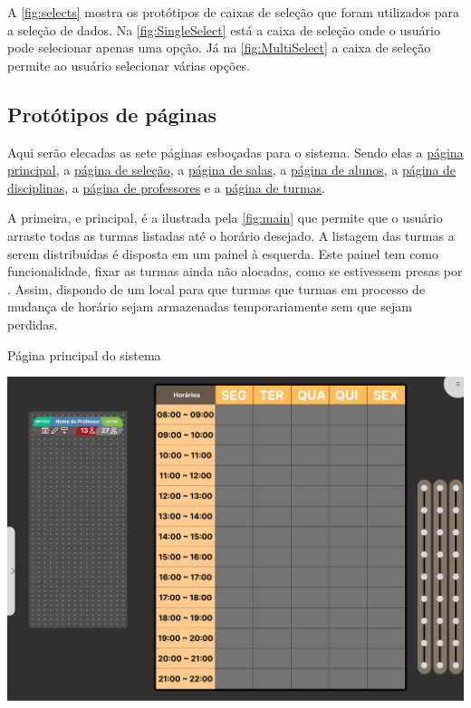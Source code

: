 A \autoref{fig:selects} mostra os protótipos de caixas de seleção que foram utilizados para a seleção de dados. Na \autoref{fig:SingleSelect} está a caixa de seleção onde o usuário pode selecionar apenas uma opção. Já na \autoref{fig:MultiSelect} a caixa de seleção permite ao usuário selecionar várias opções.

\subsection{Protótipos de páginas} \label{subsec:páginas} %

Aqui serão elecadas as sete páginas esboçadas para o sistema. Sendo elas a \hyperref[fig:main]{página principal}, a \hyperref[fig:CRUD_main]{página de seleção}, a \hyperref[fig:CRUD_salas_vazias]{página de salas}, a \hyperref[fig:CRUD_alunos]{página de alunos}, a \hyperref[fig:CRUD_disciplinas]{página de disciplinas}, a \hyperref[fig:CRUD_professores]{página de professores} e a \hyperref[fig:CRUD_turmas]{página de turmas}.

A primeira, e principal, é a ilustrada pela \autoref{fig:main} que permite que o usuário arraste todas as turmas listadas até o horário desejado. A listagem das turmas a serem distribuídas é disposta em um painel à esquerda. Este painel tem como funcionalidade, fixar as turmas ainda não alocadas, como se estivessem presas por . Assim, dispondo de um local para que turmas que turmas em processo de mudança de horário sejam armazenadas temporariamente sem que sejam perdidas.

\begin{MyCenteredFigure} \caption{Página principal do sistema} \label{fig:main}
  \includegraphics[width=\textwidth]{files/img/2.02!5-desenvolvimento/2.02!5.1.3-prototipagem/2.02!5.1.3.2-paginas/main}
\end{MyCenteredFigure}

